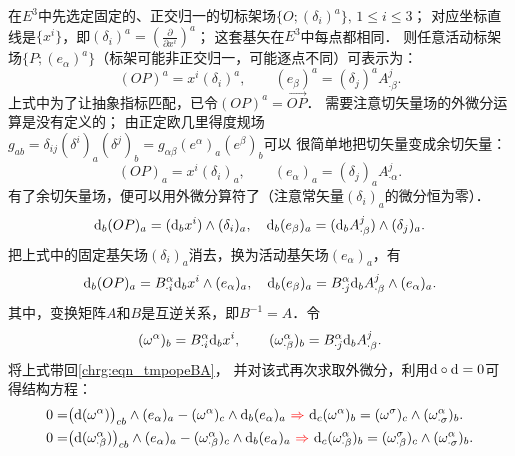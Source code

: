 在$E^3$中先选定固定的、正交归一的切标架场$\{O;(\delta_i)^a\},\, 1\leqslant i \leqslant 3$；
对应坐标直线是$\{x^i\}$，即$(\delta_i)^a= (\frac{\partial}{\partial x^i})^a$；
这套基矢在$E^3$中每点都相同．
则任意活动标架场$\{P;(e_\alpha)^a\}$（标架可能非正交归一，可能逐点不同）可表示为：
\begin{equation}
    (OP)^a = x^i (\delta_i)^a,\qquad
    (e_\beta)^a = (\delta_j)^a A^j_{\cdot \beta} .
\end{equation}
上式中为了让抽象指标匹配，已令$(OP)^a=\overrightarrow{OP}$．
需要注意切矢量场的外微分运算是没有定义的；
由正定欧几里得度规场$g_{ab}=\delta_{ij}(\delta^i)_a (\delta^j)_b
=g_{\alpha\beta}(e^\alpha)_a(e^\beta)_b$可以
很简单地把切矢量变成余切矢量：
\begin{equation}
    (OP)_a = x^i (\delta_i)_a,\qquad
    (e_\alpha)_a = (\delta_j)_a A^j_{\cdot \alpha} .
\end{equation}
有了余切矢量场，便可以用外微分算符了（注意常矢量$(\delta_i)_a$的微分恒为零）．
\begin{equation}
    {\rm d}_b (OP)_a = ({\rm d}_b x^i) \wedge (\delta_i)_a,\quad
    {\rm d}_b (e_\beta)_a = ({\rm d}_b A^j_{\cdot \beta}) \wedge  (\delta_j)_a .
\end{equation}
把上式中的固定基矢场$(\delta_i)_a$消去，换为活动基矢场$(e_\alpha)_a$，有
\begin{equation}\label{chrg:eqn_tmpopeBA}
    {\rm d}_b (OP)_a = B^{\alpha}_{\cdot i} {\rm d}_b x^i \wedge (e_\alpha)_a  ,\quad
    {\rm d}_b (e_\beta)_a = B^{\alpha}_{\cdot j}{\rm d}_b A^j_{\cdot \beta} \wedge  (e_\alpha)_a .
\end{equation}
其中，变换矩阵$A$和$B$是互逆关系，即$B^{-1} = A$．令
\begin{equation}\label{chrg:eqn_om324}
    (\omega^\alpha)_b = B^{\alpha}_{\cdot i} {\rm d}_b x^i,\qquad
    (\omega^{\alpha}_{\cdot \beta})_b=B^{\alpha}_{\cdot j}{\rm d}_b A^j_{\cdot \beta} .
\end{equation}
将上式带回\eqref{chrg:eqn_tmpopeBA}，
并对该式再次求取外微分，利用${\rm d}\circ {\rm d}=0$可得结构方程：
\setlength{\mathindent}{0em}
\begin{align}
    0=&\bigl({\rm d} (\omega^\alpha)\bigr)_{cb} \wedge (e_\alpha)_a - (\omega^\alpha)_c \wedge {\rm d}_b(e_\alpha)_a
    {\color{red}\ \Rightarrow \ }
    {\rm d}_c (\omega^\alpha)_b = (\omega^\sigma)_c\wedge (\omega_{\cdot \sigma}^\alpha)_b . \label{chrg:eqn_jgfc1} \\
    0=&\bigl({\rm d} (\omega^\alpha_{\cdot \beta})\bigr)_{cb} \wedge  (e_\alpha)_a 
    - (\omega^\alpha_{\cdot \beta})_c \wedge {\rm d}_b (e_\alpha)_a {\color{red}\ \Rightarrow \ }
    {\rm d}_c (\omega^\alpha_{\cdot \beta})_b = (\omega^{\sigma}_{\cdot \beta})_c 
    \wedge (\omega^{\alpha}_{\cdot \sigma})_b .    \label{chrg:eqn_jgfc2}
\end{align}\setlength{\mathindent}{2em}



